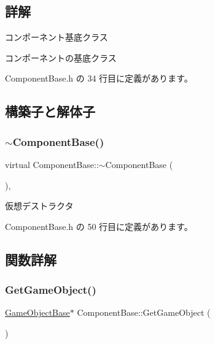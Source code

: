 \subsection{詳解}
コンポーネント基底クラス 

コンポーネントの基底クラス 

 Component\+Base.\+h の 34 行目に定義があります。



\subsection{構築子と解体子}
\mbox{\label{class_component_base_a5d22c6d5f792ff42ab6cb11a8ac38478}} 
\subsubsection{\texorpdfstring{$\sim$\+Component\+Base()}{~ComponentBase()}}
{\footnotesize\ttfamily virtual Component\+Base\+::$\sim$\+Component\+Base (\begin{DoxyParamCaption}{ }\end{DoxyParamCaption})\hspace{0.3cm}{\ttfamily [inline]}, {\ttfamily [virtual]}}



仮想デストラクタ 



 Component\+Base.\+h の 50 行目に定義があります。



\subsection{関数詳解}
\mbox{\label{class_component_base_a0ac0d71aeeb768401f34a2e780b1e25d}} 
\subsubsection{\texorpdfstring{Get\+Game\+Object()}{GetGameObject()}}
{\footnotesize\ttfamily \mbox{\hyperlink{class_game_object_base}{Game\+Object\+Base}}$\ast$ Component\+Base\+::\+Get\+Game\+Object (\begin{DoxyParamCaption}{ }\end{DoxyParamCaption})\hspace{0.3cm}{\ttfamily [inline]}}



